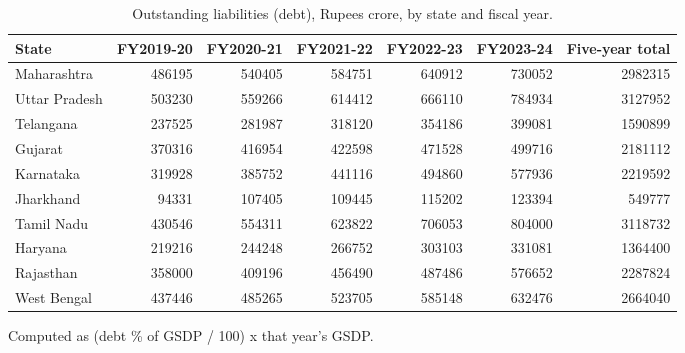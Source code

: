 \documentclass[12pt,a4paper]{article}
\begin{document}
\begin{table}[H]
\centering
\caption{Outstanding liabilities (debt), Rupees crore, by state and fiscal year.}
\label{tab:3}
\footnotesize
\begin{adjustbox}{max width=\textwidth}
\begin{tabular}{@{}lrrrrrr@{}}
\toprule
State & FY2019-20 & FY2020-21 & FY2021-22 & FY2022-23 & FY2023-24 & Five-year total \\
\midrule
Maharashtra & 486195 & 540405 & 584751 & 640912 & 730052 & 2982315 \\
Uttar Pradesh & 503230 & 559266 & 614412 & 666110 & 784934 & 3127952 \\
Telangana & 237525 & 281987 & 318120 & 354186 & 399081 & 1590899 \\
Gujarat & 370316 & 416954 & 422598 & 471528 & 499716 & 2181112 \\
Karnataka & 319928 & 385752 & 441116 & 494860 & 577936 & 2219592 \\
Jharkhand & 94331 & 107405 & 109445 & 115202 & 123394 & 549777 \\
Tamil Nadu & 430546 & 554311 & 623822 & 706053 & 804000 & 3118732 \\
Haryana & 219216 & 244248 & 266752 & 303103 & 331081 & 1364400 \\
Rajasthan & 358000 & 409196 & 456490 & 487486 & 576652 & 2287824 \\
West Bengal & 437446 & 485265 & 523705 & 585148 & 632476 & 2664040 \\
\bottomrule
\end{tabular}
\end{adjustbox}
\end{table}

Computed as (debt \% of GSDP / 100) x that year's GSDP.
\end{document}
